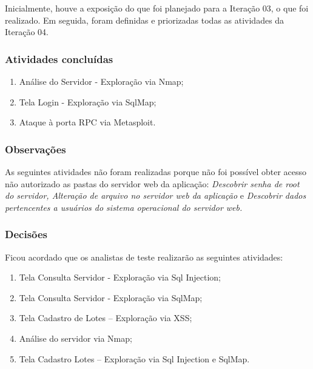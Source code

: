 \documentclass[
    12pt,               %
    openright,          %
    oneside,            %
    a4paper,            %
    section=TITLE,     %
    english,            %
    french,             %
    spanish,            %
    brazil              %
    ]{abntex2}
\begin{document}
Inicialmente, houve a exposição do que foi planejado para a Iteração 03, o que foi realizado. Em seguida, foram definidas e priorizadas todas as atividades da Iteração 04.



\subsubsection*{Atividades concluídas}


\begin{enumerate}[start=1]
	
\item Análise do Servidor - Exploração via Nmap;
	
\item Tela Login - Exploração via SqlMap;
	
\item Ataque à porta RPC via Metasploit.

\end{enumerate}


\subsubsection*{Observações}

As seguintes atividades não foram realizadas porque não foi possível obter acesso não autorizado as pastas do servidor web da aplicação: \emph{Descobrir senha de root do servidor, Alteração de arquivo no servidor web da aplicação }e\emph{ Descobrir dados pertencentes a usuários do sistema operacional do servidor web.}



\subsubsection*{Decisões}

Ficou acordado que os analistas de teste realizarão as seguintes atividades:



\begin{enumerate}[start=1]
	
\item Tela Consulta Servidor - Exploração via Sql Injection;
	
\item Tela Consulta Servidor - Exploração via SqlMap;
	
\item Tela Cadastro de Lotes -- Exploração via XSS;
	
\item Análise do servidor via Nmap;
	
\item Tela Cadastro Lotes -- Exploração via Sql Injection e SqlMap.

\end{enumerate}
\end{document}
